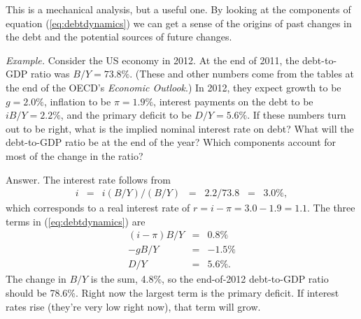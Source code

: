 \documentclass[letterpaper,12pt]{article}
\begin{document}
\begin{comment}
If interest on the debt becomes large enough, something must change.
But what?
One candidate is the deficit itself:  the government
does this analysis, realizes that interest will eat up
all its revenue, and decides to reduce the deficit.
This could come from a reduction in spending or an increase in taxes;
both work the same way in this analysis, although
in other respects the two may differ.
Another candidate --- one we'd generally prefer not to consider ---
is default.
Bond investors can do this analysis, too,
and if they find that the debt is more than the government
is likely to pay back, they will stop lending.
This tends to reduce the deficit, too,
by restricting the government's ability to finance it.
\end{comment}

This is a mechanical analysis, but a useful one.
By looking at the components of equation (\ref{eq:debtdynamics})
we can get a sense of the origins of past changes in the debt
and the potential sources of future changes.

{\it Example.\/}
Consider the US economy in 2012.
At the end of 2011, the debt-to-GDP ratio was
$B/Y = 73.8\%$.
(These and other numbers come from the tables at the end of
the OECD's {\it Economic Outlook\/}.)
In 2012, they expect growth to be $g = 2.0\%$,
inflation to be $\pi = 1.9\%$,
interest payments on the debt to be $iB/Y = 2.2\%$,
and the primary deficit to be $D/Y = 5.6\%$.
If these numbers turn out to be right,
what is the implied nominal interest rate on debt?
What will the debt-to-GDP ratio be at the end
of the year?
Which components account for most of the change in the ratio?

Answer.  The interest rate follows from
\begin{eqnarray*}
    i &=& i (B/Y) /(B/Y)
            \;\;=\;\; 2.2/73.8 \;\;=\;\; 3.0\% ,
\end{eqnarray*}
which corresponds to a real interest rate of $ r = i-\pi = 3.0 - 1.9 = 1.1$.
The three terms in (\ref{eq:debtdynamics}) are
\begin{eqnarray*}
    (i-\pi) B/Y &=& 0.8\% \\
    -g B/Y      &=& -1.5\% \\
    D/Y         &=& 5.6\% .
\end{eqnarray*}
The change in $B/Y$ is the sum, 4.8\%,
so the end-of-2012 debt-to-GDP ratio should be 78.6\%.
Right now the largest term is the primary deficit.
If interest rates rise (they're very low right now),
that term will grow.
\end{document}
